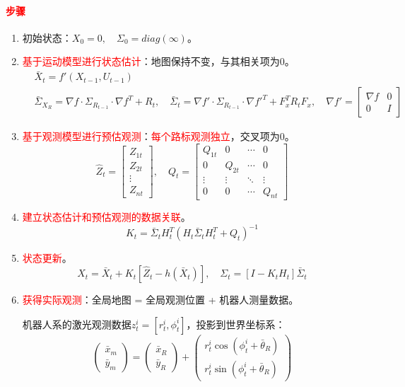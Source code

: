 \documentclass[
12pt, %
a4paper, 
oneside, %
]{scrartcl}
\begin{document}
\paragraph{\textcolor{red}{步骤}}
\begin{enumerate}
\item 初始状态：$ X_0 = 0, \quad \Sigma_0 = diag(\infty) $。
\item \textcolor{red}{基于运动模型进行状态估计}：地图保持不变，与其相关项为$ 0 $。
\begin{align*}
&\bar{X}_t = f'(X_{t - 1}, U_{t - 1}) \\
&\bar{\Sigma}_{X_R} = \nabla f \cdot \Sigma_{R_{t - 1}} \cdot \nabla f^T + R_t, \quad
\bar{\Sigma}_t = \nabla f' \cdot \Sigma_{R_{t - 1}} \cdot \nabla f'^T + F_x^T R_t F_x, \quad
\nabla f' = \begin{bmatrix} \nabla f & 0 \\ 0 & I \end{bmatrix}
\end{align*}
\item \textcolor{red}{基于观测模型进行预估观测}：\textcolor{red}{每个路标观测独立}，交叉项为$ 0 $。
$$ \hat{Z}_t = \begin{bmatrix} Z_{1t} \\ Z_{2t} \\ \vdots \\ Z_{nt} \end{bmatrix}, \quad Q_t = \begin{bmatrix} Q_{1t} & 0 & \cdots & 0 \\ 0 & Q_{2t} & \cdots & 0 \\ \vdots & \vdots & \ddots & \vdots \\ 0 & 0 & \cdots & Q_{nt} \end{bmatrix} $$
\item \textcolor{red}{建立状态估计和预估观测的数据关联}。
$$ K_t = \bar{\Sigma}_t H_t^T (H_t \bar{\Sigma}_t H_t^T + Q_t)^{-1} $$
\item \textcolor{red}{状态更新}。
$$ X_t = \bar{X}_t + K_t[\hat{Z}_t - h(\bar{X}_t)], \quad \Sigma_t = [I - K_t H_t]\bar{\Sigma}_t $$
\item \textcolor{red}{获得实际观测}：全局地图 = 全局观测位置 + 机器人测量数据。

机器人系的激光观测数据$ z^i_t = [r_t^i, \phi_t^i] $，投影到世界坐标系：
$$ \begin{pmatrix} \bar{x}_m \\ \bar{y}_m \end{pmatrix} = \begin{pmatrix} \bar{x}_R \\ \bar{y}_R \end{pmatrix} + \begin{pmatrix} r_t^i \cos(\phi_t^i + \bar{\theta}_R) \\ r_t^i \sin(\phi_t^i + \bar{\theta}_R) \end{pmatrix} $$


\end{enumerate}
\end{document}

